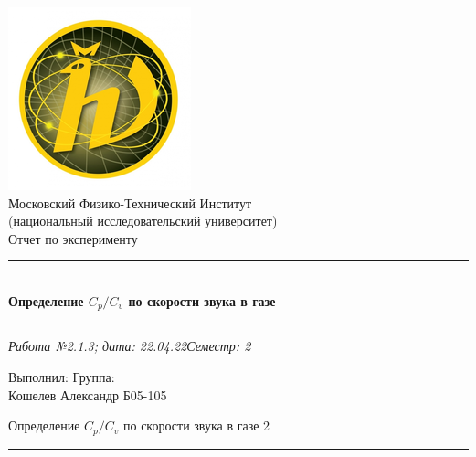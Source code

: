 \documentclass[12pt,a4paper]{scrartcl}
\begin{document}
	\begin{titlepage}
		
		\vspace*{\fill}
		
		\begin{center}
			\includegraphics[scale=0.8]{MIPT.png}
			\\[0.7cm]\Huge Московский Физико-Технический Институт\\(национальный исследовательский университет)
			\\[2cm]\LARGE Отчет по эксперименту
			\\[0.5cm]\noindent\rule{\textwidth}{1pt}
			\\\Huge\textbf{Определение $C_p /C_v$ по скорости звука в газе}
			\\[-0.5cm]\noindent\rule{\textwidth}{1pt}
		\end{center}
		
		\begin{flushleft}
			\textit{Работа №2.1.3; дата: 22.04.22}\hfill\textit{Семестр: 2}
		\end{flushleft}
		
		\vspace*{\fill}
		
		\begin{flushleft}
			Выполнил: \hspace{\fill} Группа:
			\\Кошелев Александр \hspace{\fill} Б05-105
		\end{flushleft}
	\end{titlepage}
	
	
	\begin{flushleft}
		\footnotesize{Определение $C_p /C_v$ по скорости звука в газе} \hspace{\fill} \footnotesize{2}
		\\[-0.3cm]\noindent\rule{\textwidth}{0.3pt}
	\end{flushleft}
	
\end{document}
